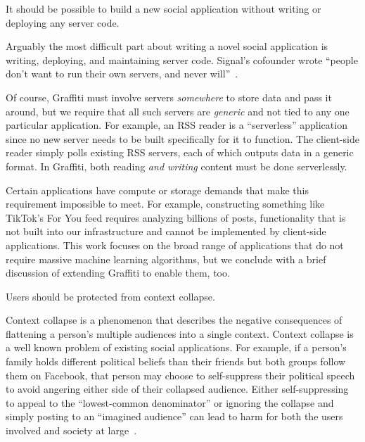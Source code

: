 \begin{requirement}[Serverless]
\label{requirements:serverless}
    It should be possible to build a new social application without writing or deploying any server code.
\end{requirement}

Arguably the most difficult part about writing a novel
social application is writing, deploying,
and maintaining server code.
Signal's cofounder wrote
``people don’t want to run their own servers, and never will''~\cite{moxieweb3}.

Of course, Graffiti must involve servers \emph{somewhere} to store data
and pass it around, but we require that all such servers are \emph{generic}
and not tied to any one particular application.
For example, an RSS reader is a ``serverless'' application since
no new server needs to be built specifically for it to function.
The client-side reader simply polls existing RSS servers, each of which outputs data in a generic format.
In Graffiti, both reading \emph{and writing} content must be done serverlessly.

Certain applications have compute or storage demands that make this requirement impossible to meet.
For example, constructing something like TikTok's For You feed requires
analyzing billions of posts, functionality that is not built into our infrastructure and cannot be implemented by client-side applications.
This work focuses on the broad range of applications
that do not require massive machine learning algorithms,
but we conclude with a brief discussion of extending Graffiti to enable them, too.

\begin{requirement}
\label{requirements:context-differentiation}
    Users should be protected from context collapse.
\end{requirement}

Context collapse is a phenomenon that describes the negative consequences of flattening
a person's multiple audiences into a single context.
Context collapse is a well known problem of existing social applications.
For example, if a person's family holds different political beliefs than their friends
but both groups follow them on Facebook, that person may choose to self-suppress their political
speech to avoid angering either side of their collapsed audience.
Either self-suppressing to appeal to the ``lowest-common denominator'' or ignoring the collapse
and simply posting to an ``imagined audience'' can lead to harm for both
the users involved and society at large~\cite{contextcollapse, contextcollapseimpact, contextcollapsequeer, spiralofsilencesocialmedia}.

